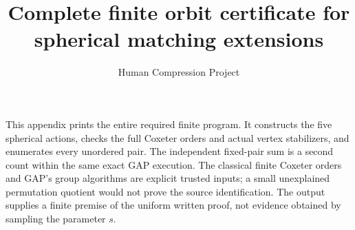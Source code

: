 
\title{Complete finite orbit certificate for spherical matching extensions}
\author{Human Compression Project}\date{}
\maketitle
This appendix prints the entire required finite program. It constructs the five spherical actions, checks the full Coxeter orders and actual vertex stabilizers, and enumerates every unordered pair. The independent fixed-pair sum is a second count within the same exact GAP execution. The classical finite Coxeter orders and GAP's group algorithms are explicit trusted inputs; a small unexplained permutation quotient would not prove the source identification. The output supplies a finite premise of the uniform written proof, not evidence obtained by sampling the parameter $s$.

